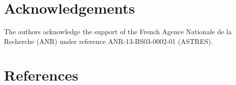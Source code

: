\documentclass{elsarticle}
\begin{document}

\section*{Acknowledgements}
The authors acknowledge the support of the French Agence Nationale de la Recherche (ANR) under reference ANR-13-BS03-0002-01 (ASTRES).

\section*{References}




\end{document}
